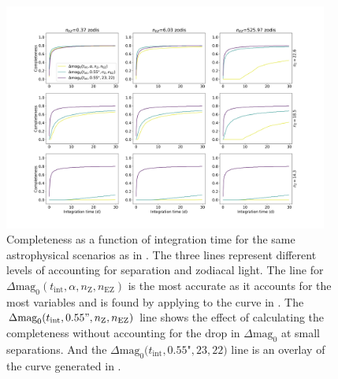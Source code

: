 \begin{figure}
  \begin{center}
    \includegraphics[width=0.95\textwidth]{ch3/figures/fZ_fEZ_comps_flat.png}
  \end{center}
  \caption{Completeness as a function of integration time for the same astrophysical
  scenarios as in . The three lines represent different levels
  of accounting for separation and zodiacal light. The line for
  $\Delta\textrm{mag}_0(t_\textrm{int}, \alpha, n_\textrm{Z}, n_\textrm{EZ})$
  is the most accurate as it accounts for the most variables and is 
  found by applying  to the curve in .
  The 
  $\Delta\textrm{mag}_0(t_\textrm{int}, 0.55", n_\textrm{Z}, n_\textrm{EZ})$
  line shows the effect of calculating the completeness without accounting for
  the drop in $\Delta\textrm{mag}_0$ at small separations. And the
  $\Delta\mathrm{mag}_0(t_\mathrm{int}, 0.55$"$, 23, 22)$
  line is an overlay of the curve generated in .
  }
  \label{fig:fZ_fEZ_comps}
\end{figure}

